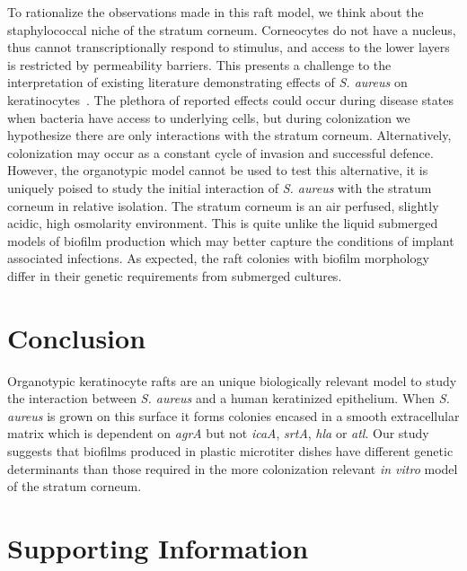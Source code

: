 \documentclass[10pt,letterpaper]{article}
\newcommand{\beginsupplement}{%
        \setcounter{table}{0}
        \renewcommand{\thetable}{S\arabic{table}}%
        \setcounter{figure}{0}
        \renewcommand{\thefigure}{S\arabic{figure}}%
     }
\begin{document}
To rationalize the observations made in this raft model, we think about the staphylococcal niche of the stratum corneum.
Corneocytes do not have a nucleus, thus cannot transcriptionally respond to stimulus, and access to the lower layers is restricted by permeability barriers.
This presents a challenge to the interpretation of existing literature demonstrating effects of \textit{S. aureus} on keratinocytes~\cite{mempel_invasion_2002, menzies_signal_2006, secor_staphylococcus_2011, soong_methicillin-resistant_2015, haugwitz_pore-forming_2006}.
The plethora of reported effects could occur during disease states when bacteria have access to underlying cells, but during colonization we hypothesize there are only interactions with the stratum corneum.
Alternatively, colonization may occur as a constant cycle of invasion and successful defence.
However, the organotypic model cannot be used to test this alternative, it is uniquely poised to study the initial interaction of \textit{S. aureus} with the stratum corneum in relative isolation.
The stratum corneum is an air perfused, slightly acidic, high osmolarity environment.
This is quite unlike the liquid submerged models of biofilm production which may better capture the conditions of implant associated infections.
As expected, the raft colonies with biofilm morphology differ in their genetic requirements from submerged cultures.

\section*{Conclusion}
Organotypic keratinocyte rafts are an unique biologically relevant model to study the interaction between \textit{S. aureus} and a human keratinized epithelium.
When \textit{S. aureus} is grown on this surface it forms colonies encased in a smooth extracellular matrix which is dependent on \textit{agrA} but not \textit{icaA}, \textit{srtA}, \textit{hla} or \textit{atl}.
Our study suggests that biofilms produced in plastic microtiter dishes have different genetic determinants than those required in the more colonization relevant \textit{in vitro} model of the stratum corneum.

\beginsupplement

\section*{Supporting Information}
\end{document}
